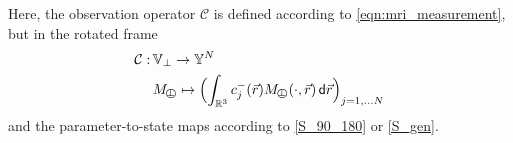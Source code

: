 \documentclass{ws-m3as}
\def\Mpp{M_{\perp\!\!\!\!\!\bigcirc}}
\newcommand\tauone{\tau^{(II)}}
\newcommand\tautwo{\tau^{(III)}}
\begin{document}

Here, the observation operator $\mathcal{C}$ is defined according to \eqref{eqn:mri_measurement}, but in the rotated frame
\begin{equation}\label{obsop}    
\begin{aligned}
\mathcal{C}:\,&\mathbb{V}_\perp\to\mathbb{Y}^N\\ 
&\Mpp\mapsto \Bigl(\int_{\mathbb{R}^3} c^-_j(\vec r) \Mpp(\cdot, \vec r) \,\textsf{d}\vec r\Bigr)_{j=1,\ldots N}
\end{aligned}
\end{equation}
and the parameter-to-state maps according to \eqref{S_90_180} or \eqref{S_gen}.
\end{document}
